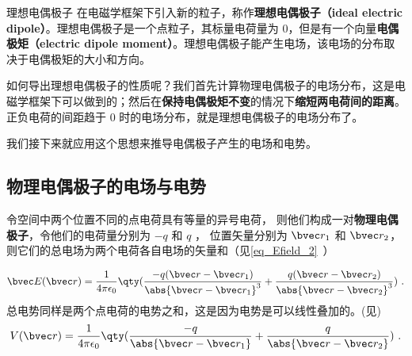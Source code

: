 \begin{definition}{理想电偶极子}
在电磁学框架下引入新的粒子，称作\textbf{理想电偶极子（ideal electric dipole）}。理想电偶极子是一个点粒子，其标量电荷量为 $0$，但是有一个向量\textbf{电偶极矩（electric dipole moment）}。理想电偶极子能产生电场，该电场的分布取决于电偶极矩的大小和方向。
\end{definition}


如何导出理想电偶极子的性质呢？我们首先计算物理电偶极子的电场分布，这是电磁学框架下可以做到的；然后在\textbf{保持电偶极矩不变}的情况下\textbf{缩短两电荷间的距离}。正负电荷的间距趋于 $0$ 时的电场分布，就是理想电偶极子的电场分布了。

我们接下来就应用这个思想来推导电偶极子产生的电场和电势。


\subsection{物理电偶极子的电场与电势}

令空间中两个位置不同的点电荷具有等量的异号电荷， 则他们构成一对\textbf{物理电偶极子}，令他们的电荷量分别为 $-q$ 和 $q$ ， 位置矢量分别为 $\bvec r_1$ 和 $\bvec r_2$， 则它们的总电场为两个电荷各自电场的矢量和（见\autoref{eq_Efield_2}~）

\begin{equation}
\bvec E(\bvec r) = \frac{1}{4\pi\epsilon_0} \qty(\frac{-q(\bvec r - \bvec r_1)}{\abs{\bvec r - \bvec r_1}^3} + \frac{q(\bvec r - \bvec r_2)}{\abs{\bvec r - \bvec r_2}^3})~.
\end{equation}
总电势同样是两个点电荷的电势之和，这是因为电势是可以线性叠加的。(见)
\begin{equation}\label{eq_eleDpl_4}
V(\bvec r) = \frac{1}{4\pi\epsilon_0} \qty(\frac{-q}{\abs{\bvec r - \bvec r_1}} + \frac{q}{\abs{\bvec r - \bvec r_2}})~.
\end{equation}


